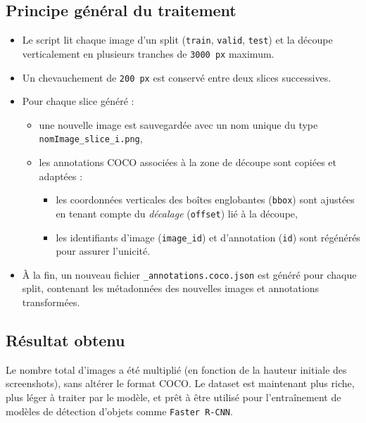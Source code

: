 \documentclass[12pt,a4paper]{report}
\begin{document}
\subsection{Principe général du traitement}

\begin{itemize}
  \item Le script lit chaque image d’un split (\texttt{train}, \texttt{valid}, \texttt{test}) et la découpe verticalement en plusieurs tranches de \texttt{3000~px} maximum.
  \item Un chevauchement de \texttt{200~px} est conservé entre deux slices successives.
  \item Pour chaque slice généré :
  \begin{itemize}
    \item une nouvelle image est sauvegardée avec un nom unique du type \texttt{nomImage\_slice\_i.png},
    \item les annotations COCO associées à la zone de découpe sont copiées et adaptées :
    \begin{itemize}
      \item les coordonnées verticales des boîtes englobantes (\texttt{bbox}) sont ajustées en tenant compte du \textit{décalage} (\texttt{offset}) lié à la découpe,
      \item les identifiants d’image (\texttt{image\_id}) et d’annotation (\texttt{id}) sont régénérés pour assurer l’unicité.
    \end{itemize}
  \end{itemize}
  \item À la fin, un nouveau fichier \texttt{\_annotations.coco.json} est généré pour chaque split, contenant les métadonnées des nouvelles images et annotations transformées.
\end{itemize}

\subsection{Résultat obtenu}

Le nombre total d’images a été multiplié (en fonction de la hauteur initiale des screenshots), sans altérer le format COCO. Le dataset est maintenant plus riche, plus léger à traiter par le modèle, et prêt à être utilisé pour l’entraînement de modèles de détection d’objets comme \texttt{Faster R-CNN}.
\end{document}
